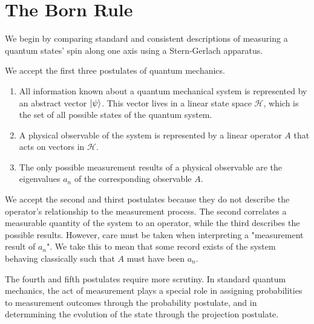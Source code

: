 \section{The Born Rule}


We begin by comparing standard and consistent descriptions of measuring a quantum states' spin along one axis using a Stern-Gerlach apparatus.

We accept the first three postulates of quantum mechanics.

\begin{enumerate}
    \item All information known about a quantum mechanical system is represented by an abstract vector $\ket{\psi}$. This vector lives in a linear state space $\mathcal{H}$, which is the set of all possible states of the quantum system.
    \item A physical observable of the system is represented by a linear operator $A$ that acts on vectors in $\mathcal{H}$.
    \item The only possible measurement results of a physical observable are the eigenvalues $a_n$ of the corresponding observable $A$.
\end{enumerate}

We accept the second and thirst postulates because they do not describe the operator's relationship to the measurement process. The second correlates a measurable quantity of the system to an operator, while the third describes the possible results. However, care must be taken when interpreting a "measurement result of $a_n$". We take this to mean that some record exists of the system behaving classically such that $A$ must have been $a_n$.

The fourth and fifth postulates require more scrutiny. In standard quantum mechanics, the act of measurement plays a special role in assigning probabilities to measurement outcomes through the probability postulate, and in determmining the evolution of the state through the projection postulate.

